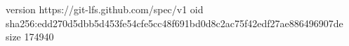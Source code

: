 version https://git-lfs.github.com/spec/v1
oid sha256:edd270d5dbb5d453fe54cfe5cc48f691bd0d8c2ac75f42edf27ae886496907de
size 174940
